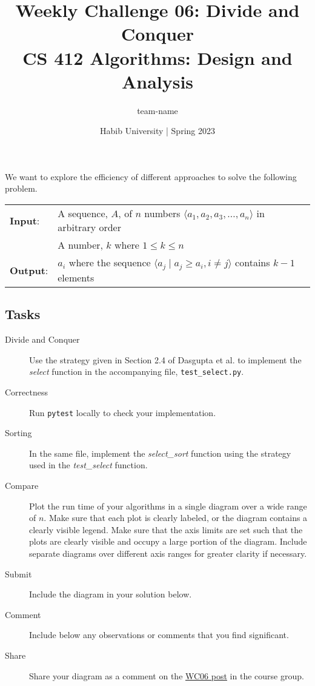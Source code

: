 \documentclass[a4paper]{exam}
\title{Weekly Challenge 06: Divide and Conquer\\CS 412 Algorithms: Design and Analysis}
\author{team-name}  %
\date{Habib University | Spring 2023}
\begin{document}
\maketitle

\begin{questions}

  

  We want to explore the efficiency of different approaches to solve the following problem.

  \begin{tabular}{ll}
    \textbf{Input}: & A sequence, $A$, of $n$ numbers $\langle a_1, a_2, a_3, \ldots, a_n \rangle$ in arbitrary order \\
            & A number, $k$ where $1 \leq k \leq n$\\
    \textbf{Output}: & $a_i$ where the sequence $\langle a_j \mid a_j \geq a_i, i\neq j \rangle$ contains $k-1$ elements
  \end{tabular}
  \smallskip

  \subsection*{Tasks}
  \begin{description}
  \item[Divide and Conquer] Use the strategy given in Section 2.4 of Dasgupta et al. to implement the \textit{select} function in the accompanying file, \texttt{test\_select.py}.
  \item[Correctness] Run \texttt{pytest} locally to check your implementation.
  \item[Sorting] In the same file, implement the \textit{select\_sort} function using the strategy used in the \textit{test\_select} function.
  \item[Compare] Plot the run time of your algorithms in a single diagram over a wide range of $n$. Make sure that each plot is clearly labeled, or the diagram contains a clearly visible legend. Make sure that the axis limits are set such that the plots are clearly visible and occupy a large portion of the diagram. Include separate diagrams over different axis ranges for greater clarity if necessary.
  \item[Submit] Include the diagram in your solution below.
  \item[Comment] Include below any observations or comments that you find significant.
  \item[Share] Share your diagram as a comment on the \href{https://web.yammer.com/main/org/habib.edu.pk/threads/eyJfdHlwZSI6IlRocmVhZCIsImlkIjoiMjEzNDMyMjU5OTgxMzEyMCJ9}{WC06 post} in the course group.
  \end{description}
  
  \begin{solution}
  \end{solution}

\end{questions}
\end{document}
